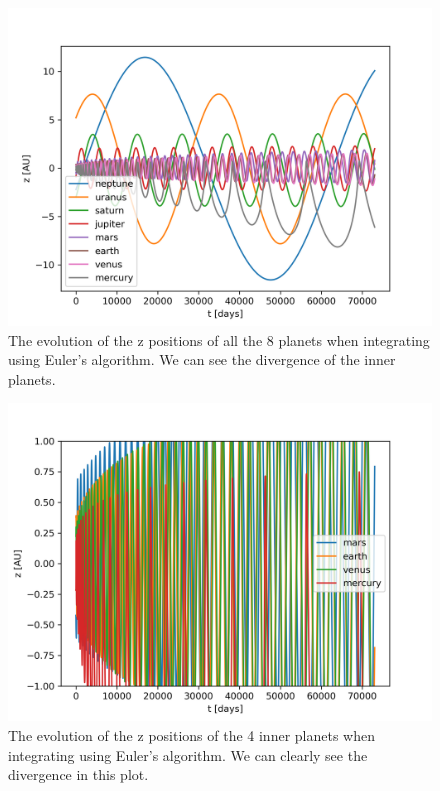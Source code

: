 \documentclass[a4paper,10pt]{article}
\begin{document}
\begin{figure}[H]
  \centering
  \includegraphics[width=.8\linewidth]{./plots/z-euler.png}
  \caption{The evolution of the z positions of all the 8 planets when integrating using Euler's algorithm. We can see the divergence of the inner planets.}
  \label{fig:z-eul}
\end{figure}

\begin{figure}[H]
  \centering
  \includegraphics[width=.8\linewidth]{./plots/z-euler-zoom.png}
  \caption{The evolution of the z positions of the 4 inner planets when integrating using Euler's algorithm. We can clearly see the divergence in this plot.}
  \label{fig:z-eul-zoom}
\end{figure}
\end{document}
